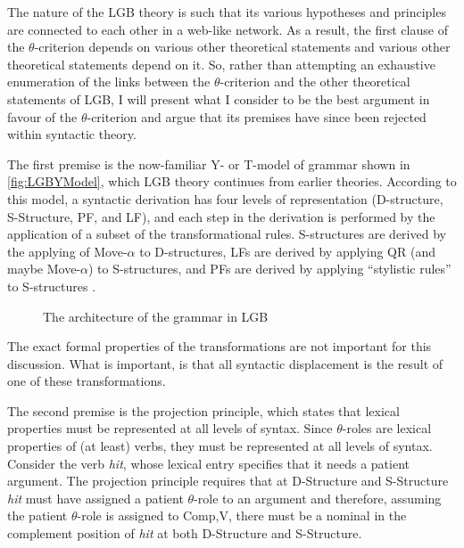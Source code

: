 The nature of the LGB theory is such that its various hypotheses and principles are connected to each other in a web-like network.
As a result, the first clause of the $\theta$-criterion depends on various other theoretical statements and various other theoretical statements depend on it.
So, rather than attempting an exhaustive enumeration of the links between the $\theta$-criterion and the other theoretical statements of LGB, I will present what I consider to be the best argument in favour of the $\theta$-criterion and argue that its premises have since been rejected within syntactic theory.

The first premise is the now-familiar Y- or T-model of grammar shown in \autoref{fig:LGBYModel}, which LGB theory continues from earlier theories.
According to this model, a syntactic derivation has four levels of representation (D-structure, S-Structure, PF, and LF), and each step in the derivation is performed by the application of a subset of the transformational rules.
S-structures are derived by the applying of Move-$\alpha$ to D-structures, LFs are derived by applying QR (and maybe Move-$\alpha$) to S-structures, and PFs are derived by applying ``stylistic rules'' to S-structures \parencite[18]{chomsky1981lectures}.
\begin{figure}[h]
	\centering
{}
	\caption{The architecture of the grammar in LGB}
	\label{fig:LGBYModel}
\end{figure}
The exact formal properties of the transformations are not important for this discussion.
What is important, is that all syntactic displacement is the result of one of these transformations.

The second premise is the projection principle, which states that lexical properties must be represented at all levels of syntax.
Since $\theta$-roles are lexical properties of (at least) verbs, they must be represented at all levels of syntax.
Consider the verb \textit{hit}, whose lexical entry specifies that it needs a patient argument.
The projection principle requires that at D-Structure and S-Structure \textit{hit} must have assigned a patient $\theta$-role to an argument and therefore, assuming the patient $\theta$-role is assigned to Comp,V, there must be a nominal in the complement position of \textit{hit} at both D-Structure and S-Structure.

